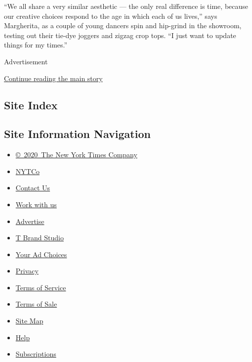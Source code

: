 ``We all share a very similar aesthetic --- the only real difference is
time, because our creative choices respond to the age in which each of
us lives,'' says Margherita, as a couple of young dancers spin and
hip-grind in the showroom, testing out their tie-dye joggers and zigzag
crop tops. ``I just want to update things for my times.''

Advertisement

\protect\hyperlink{after-bottom}{Continue reading the main story}

\hypertarget{site-index}{%
\subsection{Site Index}\label{site-index}}

\hypertarget{site-information-navigation}{%
\subsection{Site Information
Navigation}\label{site-information-navigation}}

\begin{itemize}
\tightlist
\item
  \href{https://help.nytimes.com/hc/en-us/articles/115014792127-Copyright-notice}{©~2020~The
  New York Times Company}
\end{itemize}

\begin{itemize}
\tightlist
\item
  \href{https://www.nytco.com/}{NYTCo}
\item
  \href{https://help.nytimes.com/hc/en-us/articles/115015385887-Contact-Us}{Contact
  Us}
\item
  \href{https://www.nytco.com/careers/}{Work with us}
\item
  \href{https://nytmediakit.com/}{Advertise}
\item
  \href{http://www.tbrandstudio.com/}{T Brand Studio}
\item
  \href{https://www.nytimes.com/privacy/cookie-policy\#how-do-i-manage-trackers}{Your
  Ad Choices}
\item
  \href{https://www.nytimes.com/privacy}{Privacy}
\item
  \href{https://help.nytimes.com/hc/en-us/articles/115014893428-Terms-of-service}{Terms
  of Service}
\item
  \href{https://help.nytimes.com/hc/en-us/articles/115014893968-Terms-of-sale}{Terms
  of Sale}
\item
  \href{https://spiderbites.nytimes.com}{Site Map}
\item
  \href{https://help.nytimes.com/hc/en-us}{Help}
\item
  \href{https://www.nytimes.com/subscription?campaignId=37WXW}{Subscriptions}
\end{itemize}
